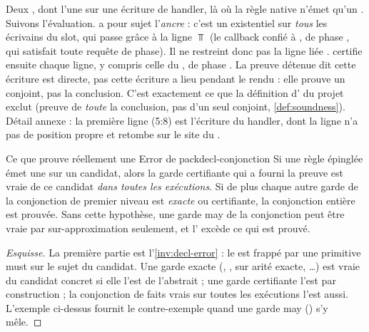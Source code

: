 Deux \Error{}, dont l'une sur une écriture de handler, là où la règle native  n'émet qu'un \Warning{}. Suivons l'évaluation.  a pour sujet l'\emph{ancre} : c'est un existentiel sur \emph{tous} les écrivains du slot, qui passe grâce à la ligne $\Top$ (le callback confié à , de phase , qui satisfait toute requête de phase). Il ne restreint donc pas la ligne liée .  certifie ensuite chaque ligne, y compris celle du , de phase . La preuve détenue dit \og cette écriture est directe\fg{}, pas \og cette écriture a lieu pendant le rendu\fg{} : elle prouve un conjoint, pas la conclusion. C'est exactement ce que la définition d'\Error{} du projet exclut (\og preuve de \emph{toute} la conclusion, pas d'un seul conjoint\fg{}, \cref{def:soundness}). Détail annexe : la première ligne (5:8) est l'écriture  du handler, dont la ligne  n'a pas de position propre et retombe sur le site du .

\begin{proposition}{Ce que prouve réellement une Error de pack}{decl-conjonction}
Si une règle épinglée  émet une \Error{} sur un candidat, alors la garde certifiante qui a fourni la preuve est vraie de ce candidat \emph{dans toutes les exécutions}. Si de plus chaque autre garde de la conjonction de premier niveau est \emph{exacte} ou certifiante, la conjonction entière est prouvée. Sans cette hypothèse, une garde may de la conjonction peut être vraie par sur-approximation seulement, et l'\Error{} excède ce qui est prouvé.
\end{proposition}

\begin{proof}[Esquisse]
La première partie est l'\cref{inv:decl-error} : le  est frappé par une primitive must sur le sujet du candidat. Une garde exacte (, ,  sur arité exacte, \ldots) est vraie du candidat concret si elle l'est de l'abstrait ; une garde certifiante l'est par construction ; la conjonction de faits vrais sur toutes les exécutions l'est aussi. L'exemple ci-dessus fournit le contre-exemple quand une garde may () s'y mêle.
\end{proof}


